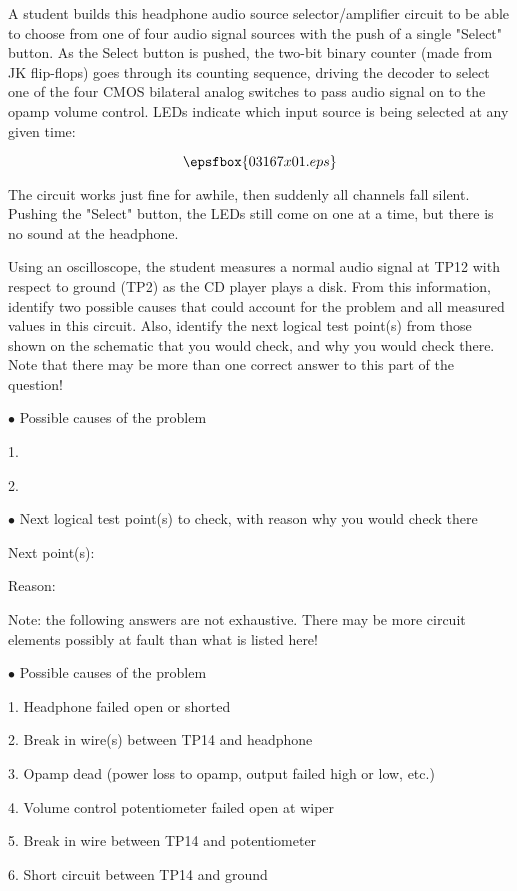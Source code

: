 

A student builds this headphone audio source selector/amplifier circuit to be able to choose from one of four audio signal sources with the push of a single "Select" button.  As the Select button is pushed, the two-bit binary counter (made from JK flip-flops) goes through its counting sequence, driving the decoder to select one of the four CMOS bilateral analog switches to pass audio signal on to the opamp volume control.  LEDs indicate which input source is being selected at any given time:

$$\epsfbox{03167x01.eps}$$

The circuit works just fine for awhile, then suddenly all channels fall silent.  Pushing the "Select" button, the LEDs still come on one at a time, but there is no sound at the headphone.

Using an oscilloscope, the student measures a normal audio signal at TP12 with respect to ground (TP2) as the CD player plays a disk.  From this information, identify two possible causes that could account for the problem and all measured values in this circuit.  Also, identify the next logical test point(s) from those shown on the schematic that you would check, and why you would check there.  Note that there may be more than one correct answer to this part of the question!

\medskip
\goodbreak
\item{$\bullet$} Possible causes of the problem
\item{1.}
\item{2.} 
\medskip

\medskip
\item{$\bullet$} Next logical test point(s) to check, with reason why you would check there
\item{Next point(s):}
\item{Reason:}
\medskip







Note: the following answers are not exhaustive.  There may be more circuit elements possibly at fault than what is listed here!

\medskip
\goodbreak
\item{$\bullet$} Possible causes of the problem
\item{1.} Headphone failed open or shorted
\item{2.} Break in wire(s) between TP14 and headphone
\item{3.} Opamp dead (power loss to opamp, output failed high or low, etc.)
\item{4.} Volume control potentiometer failed open at wiper
\item{5.} Break in wire between TP14 and potentiometer
\item{6.} Short circuit between TP14 and ground
\medskip

